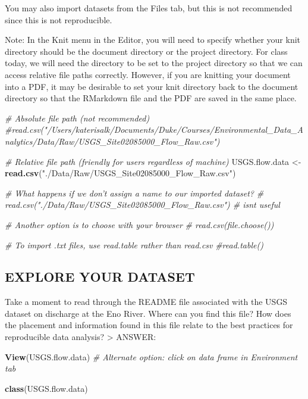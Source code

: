 \documentclass[]{article}
\newenvironment{Shaded}{\begin{snugshade}}{\end{snugshade}}
\newcommand{\KeywordTok}[1]{\textcolor[rgb]{0.13,0.29,0.53}{\textbf{#1}}}
\newcommand{\StringTok}[1]{\textcolor[rgb]{0.31,0.60,0.02}{#1}}
\newcommand{\CommentTok}[1]{\textcolor[rgb]{0.56,0.35,0.01}{\textit{#1}}}
\newcommand{\NormalTok}[1]{#1}
\begin{document}
You may also import datasets from the Files tab, but this is not
recommended since this is not reproducible.

Note: In the Knit menu in the Editor, you will need to specify whether
your knit directory should be the document directory or the project
directory. For class today, we will need the directory to be set to the
project directory so that we can access relative file paths correctly.
However, if you are knitting your document into a PDF, it may be
desirable to set your knit directory back to the document directory so
that the RMarkdown file and the PDF are saved in the same place.

\begin{Shaded}
\begin{Highlighting}[]
\CommentTok{# Absolute file path (not recommended)}
\CommentTok{#read.csv("/Users/katerisalk/Documents/Duke/Courses/Environmental_Data_Analytics/Data/Raw/USGS_Site02085000_Flow_Raw.csv")}

\CommentTok{# Relative file path (friendly for users regardless of machine)}
\NormalTok{USGS.flow.data <-}\StringTok{ }\KeywordTok{read.csv}\NormalTok{(}\StringTok{"./Data/Raw/USGS_Site02085000_Flow_Raw.csv"}\NormalTok{)}

\CommentTok{# What happens if we don't assign a name to our imported dataset?}
\CommentTok{# read.csv("./Data/Raw/USGS_Site02085000_Flow_Raw.csv") # isnt useful}

\CommentTok{# Another option is to choose with your browser}
\CommentTok{# read.csv(file.choose())}

\CommentTok{# To import .txt files, use read.table rather than read.csv}
\CommentTok{#read.table()}
\end{Highlighting}
\end{Shaded}

\subsection{EXPLORE YOUR DATASET}\label{explore-your-dataset}

Take a moment to read through the README file associated with the USGS
dataset on discharge at the Eno River. Where can you find this file? How
does the placement and information found in this file relate to the best
practices for reproducible data analysis? \textgreater{} ANSWER:

\begin{Shaded}
\begin{Highlighting}[]
\KeywordTok{View}\NormalTok{(USGS.flow.data)}
\CommentTok{# Alternate option: click on data frame in Environment tab}

\KeywordTok{class}\NormalTok{(USGS.flow.data)}
\end{Highlighting}
\end{Shaded}
\end{document}
